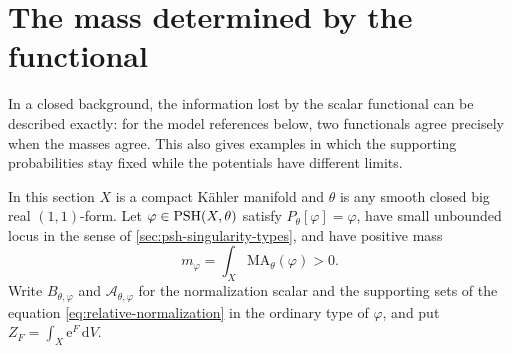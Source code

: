 \section{The mass determined by the functional}\label{sec:normalization-mass-quotient}

In a closed background, the information lost by the scalar functional can be described exactly: for the model references below, two functionals agree precisely when the masses agree. This also gives examples in which the supporting probabilities stay fixed while the potentials have different limits.

In this section $X$ is a compact K\"ahler manifold and $\theta$ is any smooth closed big real $(1,1)$-form. Let $\varphi\in\mathrm{PSH}(X,\theta)$ satisfy $P_\theta[\varphi]=\varphi$, have small unbounded locus in the sense of \cref{sec:psh-singularity-types}, and have positive mass
\[
 m_\varphi=\int_X\mathrm{MA}_\theta(\varphi)>0.
\]
Write $B_{\theta,\varphi}$ and $\mathcal A_{\theta,\varphi}$ for the normalization scalar and the supporting sets of the equation \eqref{eq:relative-normalization} in the ordinary type of $\varphi$, and put $Z_F=\int_X\mathrm{e}^F\,\mathrm{d}V$.

